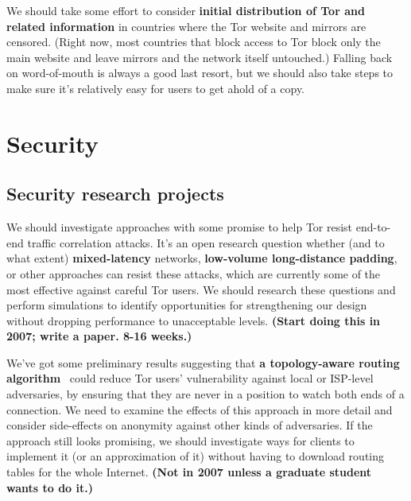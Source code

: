 \documentclass{article}
\newcommand{\tmp}[1]{{\bf #1} [......] \\}
\newcommand{\plan}[1]{ {\bf (#1)}}
\begin{document}
We should take some effort to consider {\bf initial distribution of Tor and
  related information} in countries where the Tor website and mirrors are
censored.  (Right now, most countries that block access to Tor block only the
main website and leave mirrors and the network itself untouched.)  Falling
back on word-of-mouth is always a good last resort, but we should also take
steps to make sure it's relatively easy for users to get ahold of a copy.

\section{Security}

\subsection{Security research projects}

We should investigate approaches with some promise to help Tor resist
end-to-end traffic correlation attacks.  It's an open research question
whether (and to what extent) {\bf mixed-latency} networks, {\bf low-volume
  long-distance padding}, or other approaches can resist these attacks, which
are currently some of the most effective against careful Tor users.  We
should research these questions and perform simulations to identify
opportunities for strengthening our design without dropping performance to
unacceptable levels. %
\plan{Start doing this in 2007; write a paper.  8-16 weeks.}

We've got some preliminary results suggesting that {\bf a topology-aware
  routing algorithm}~\cite{feamster:wpes2004} could reduce Tor users'
vulnerability against local or ISP-level adversaries, by ensuring that they
are never in a position to watch both ends of a connection.  We need to
examine the effects of this approach in more detail and consider side-effects
on anonymity against other kinds of adversaries.  If the approach still looks
promising, we should investigate ways for clients to implement it (or an
approximation of it) without having to download routing tables for the whole
Internet. \plan{Not in 2007 unless a graduate student wants to do it.}

%
\end{document}
